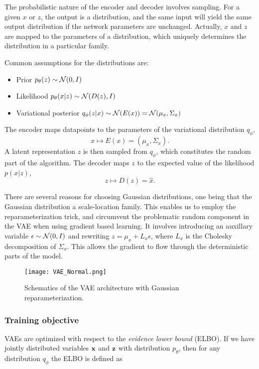 \documentclass[../../thesis.tex]{subfiles}
\begin{document}
The probabilistic nature of the encoder and decoder involves sampling. For a given $x$ or $z$, the output is a distribution, and the same input will yield the same output distribution if the network parameters are unchanged. Actually, $x$ and $z$ are mapped to the parameters of a distribution, which uniquely determines the distribution in a particular family.\newline

Common assumptions for the distributions are:
\begin{itemize}
    \item Prior $p_\theta(z)\sim \mathcal{N}(0,I)$
    \item Likelihood $p_\theta(x|z)\sim \mathcal{N}(D(z), I)$
    \item Variational posterior $q_\phi(z|x)\sim \mathcal{N}(E(x)) = \mathcal{N}(\mu_x, \Sigma_x)$
\end{itemize}
The encoder maps datapoints to the parameters of the variational distribution $q_\phi$, 
$$x \mapsto E(x) = (\mu_x, \Sigma_x).$$ 
A latent representation $z$ is then sampled from $q_\phi$, which constitutes the random part of the algorithm. The decoder maps $z$ to the expected value of the likelihood $p(x|z)$, 
$$z \mapsto D(z) = \widehat{x}.$$ 

There are several reasons for choosing Gaussian distributions, one being that the Gaussian distribution a scale-location family. This enables us to employ the reparameterization trick, and circumvent the problematic random component in the VAE when using gradient based learning. It involves introducing an auxillary variable $\epsilon \sim \mathcal{N}(0,I)$ and rewriting $z = \mu_x + L_x\epsilon $, where $L_x$ is the Cholesky decomposition of $\Sigma_x$. This allows the gradient to flow through the deterministic parts of the model.
\begin{figure}[h]
    \texttt{[image: VAE\_Normal.png]}
    \centering
    \caption{Schematics of the VAE architecture with Gaussian reparameterization.}
    \label{fig:VAE_Normal}
\end{figure}


\subsubsection{Training objective}

VAEs are optimized with respect to the \textit{evidence lower bound} (ELBO). If we have jointly distributed variables $\mathbf{x}$ and $\mathbf{z}$ with distribution $p_\theta$, then for any distribution $q_\phi$ the ELBO is defined as
\end{document}
